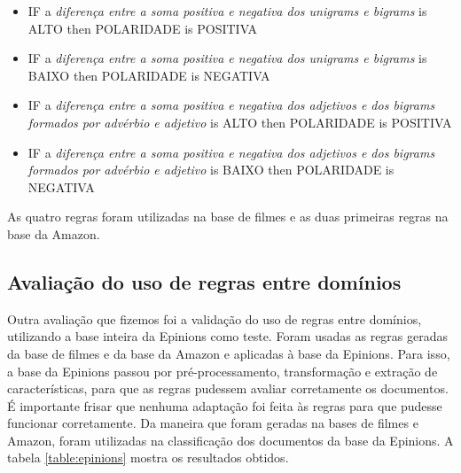 \documentclass[template.tex]{subfiles}
\begin{document}
\begin{itemize}
\item IF a \textit{diferença entre a soma positiva e negativa dos unigrams e bigrams} is ALTO then POLARIDADE is POSITIVA
\item IF a \textit{diferença entre a soma positiva e negativa dos unigrams e bigrams} is BAIXO then POLARIDADE is NEGATIVA
\item IF a \textit{diferença entre a soma positiva e negativa dos adjetivos e dos bigrams formados por advérbio e adjetivo} is ALTO then POLARIDADE is POSITIVA
\item IF a \textit{diferença entre a soma positiva e negativa dos adjetivos e dos bigrams formados por advérbio e adjetivo} is BAIXO then POLARIDADE is NEGATIVA
\end{itemize}

As quatro regras foram utilizadas na base de filmes e as duas primeiras regras na base da Amazon.

\subsection{Avaliação do uso de regras entre domínios}

Outra avaliação que fizemos foi a validação do uso de regras entre domínios, utilizando a base inteira da Epinions como teste. Foram usadas as regras geradas da base de filmes e da base da Amazon e aplicadas à base da Epinions.  Para isso, a base da Epinions passou por pré-processamento, transformação e extração de características, para que as regras pudessem avaliar corretamente os documentos. É importante frisar que nenhuma adaptação foi feita às regras para que pudesse funcionar corretamente. Da maneira que foram geradas na bases de filmes e Amazon, foram utilizadas na classificação dos documentos da base da Epinions. A tabela \ref{table:epinions} mostra os resultados obtidos.
\end{document}

